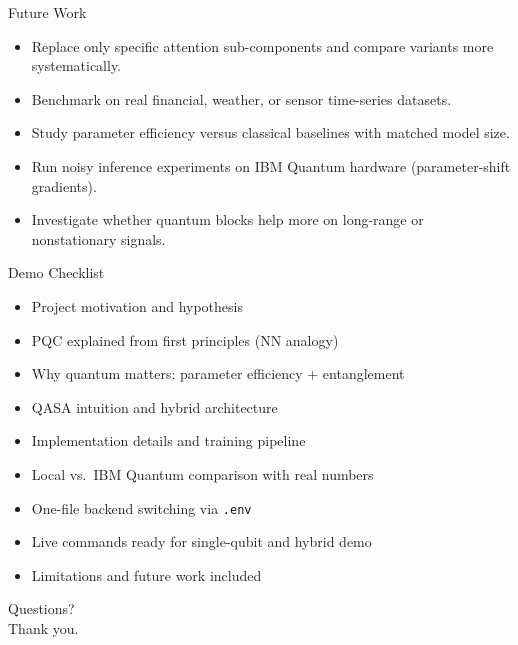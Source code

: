 \documentclass[aspectratio=169,professionalfonts]{beamer}
\begin{document}
\begin{frame}{Future Work}
\begin{itemize}
  \item Replace only specific attention sub-components and compare variants more systematically.
  \item Benchmark on real financial, weather, or sensor time-series datasets.
  \item Study parameter efficiency versus classical baselines with matched model size.
  \item Run noisy inference experiments on IBM Quantum hardware (parameter-shift gradients).
  \item Investigate whether quantum blocks help more on long-range or nonstationary signals.
\end{itemize}
\end{frame}

\begin{frame}{Demo Checklist}
\begin{itemize}
  \item[$\checkmark$] Project motivation and hypothesis
  \item[$\checkmark$] PQC explained from first principles (NN analogy)
  \item[$\checkmark$] Why quantum matters: parameter efficiency + entanglement
  \item[$\checkmark$] QASA intuition and hybrid architecture
  \item[$\checkmark$] Implementation details and training pipeline
  \item[$\checkmark$] Local vs.\ IBM Quantum comparison with real numbers
  \item[$\checkmark$] One-file backend switching via \texttt{.env}
  \item[$\checkmark$] Live commands ready for single-qubit and hybrid demo
  \item[$\checkmark$] Limitations and future work included
\end{itemize}
\end{frame}

\begin{frame}
  \centering
  \Huge Questions?\\[0.8em]
  \Large Thank you.
\end{frame}
\end{document}
